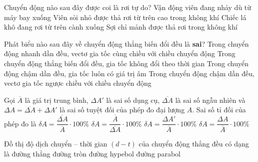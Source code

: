 \begin{ex}
	Chuyển động nào sau đây được coi là rơi tự do?
	\choice
	{Vận động viên đang nhảy dù từ máy bay xuống}
	{\True Viên sỏi nhỏ được thả rơi từ trên cao trong không khí}
	{Chiếc lá khô đang rơi từ trên cành xuống}
	{Sợi chỉ mảnh được thả rơi trong không khí}
\end{ex}

\begin{ex}
	Phát biểu nào sau đây về chuyển động thẳng biến đổi đều là \textbf{sai}?
	\choice
	{Trong chuyển động nhanh dần đều, vectơ gia tốc cùng chiều với chiều chuyển động}
	{Trong chuyển động thẳng biến đổi đều, gia tốc không đổi theo thời gian}
	{\True Trong chuyển động chậm dần đều, gia tốc luôn có giá trị âm}
	{Trong chuyển động chậm dần đều, vectơ gia tốc ngược chiều với chiều chuyển động}
\end{ex}

\begin{ex}
	Gọi $\overline{A}$ là giá trị trung bình, $\Delta A'$ là sai số dụng cụ, $\overline{\Delta A}$ là sai số ngẫu nhiên và $\Delta A = \overline{\Delta A} + \Delta A'$ là sai số tuyệt đối của phép đo đại lượng $A$. Sai số tỉ đối của phép đo là
	\choice
	{$\delta A = \dfrac{\overline{\Delta A}}{\overline{A}} \cdot 100\%$}
	{$\delta A = \dfrac{\overline{A}}{\overline{\Delta A}} \cdot 100\%$}
	{$\delta A = \dfrac{\Delta A'}{\overline{A}} \cdot 100\%$}
	{\True $\delta A = \dfrac{\Delta A}{\overline{A}} \cdot 100\%$}
\end{ex}

\begin{ex}
	Đồ thị độ dịch chuyển -- thời gian $(d - t)$ của chuyển động thẳng đều có dạng là
	\choice
	{\True đường thẳng}
	{đường tròn}
	{đường hypebol}
	{đường parabol}
\end{ex}


